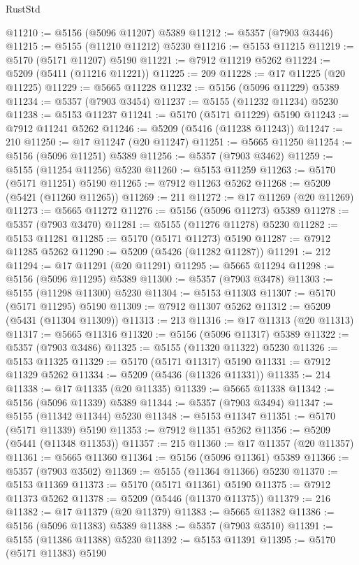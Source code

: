 \begin{lexlean}{RustStd}
\begin{coremodule}
@11210 := @5156 (@5096 @11207) @5389
@11212 := @5357 (@7903 @3446)
@11215 := @5155 (@11210 @11212) @5230
@11216 := @5153 @11215
@11219 := @5170 (@5171 @11207) @5190
@11221 := @7912 @11219 @5262
@11224 := @5209 (@5411 (@11216 @11221))
@11225 := 209
@11228 := @17 @11225 (@20 @11225)
@11229 := @5665 @11228
@11232 := @5156 (@5096 @11229) @5389
@11234 := @5357 (@7903 @3454)
@11237 := @5155 (@11232 @11234) @5230
@11238 := @5153 @11237
@11241 := @5170 (@5171 @11229) @5190
@11243 := @7912 @11241 @5262
@11246 := @5209 (@5416 (@11238 @11243))
@11247 := 210
@11250 := @17 @11247 (@20 @11247)
@11251 := @5665 @11250
@11254 := @5156 (@5096 @11251) @5389
@11256 := @5357 (@7903 @3462)
@11259 := @5155 (@11254 @11256) @5230
@11260 := @5153 @11259
@11263 := @5170 (@5171 @11251) @5190
@11265 := @7912 @11263 @5262
@11268 := @5209 (@5421 (@11260 @11265))
@11269 := 211
@11272 := @17 @11269 (@20 @11269)
@11273 := @5665 @11272
@11276 := @5156 (@5096 @11273) @5389
@11278 := @5357 (@7903 @3470)
@11281 := @5155 (@11276 @11278) @5230
@11282 := @5153 @11281
@11285 := @5170 (@5171 @11273) @5190
@11287 := @7912 @11285 @5262
@11290 := @5209 (@5426 (@11282 @11287))
@11291 := 212
@11294 := @17 @11291 (@20 @11291)
@11295 := @5665 @11294
@11298 := @5156 (@5096 @11295) @5389
@11300 := @5357 (@7903 @3478)
@11303 := @5155 (@11298 @11300) @5230
@11304 := @5153 @11303
@11307 := @5170 (@5171 @11295) @5190
@11309 := @7912 @11307 @5262
@11312 := @5209 (@5431 (@11304 @11309))
@11313 := 213
@11316 := @17 @11313 (@20 @11313)
@11317 := @5665 @11316
@11320 := @5156 (@5096 @11317) @5389
@11322 := @5357 (@7903 @3486)
@11325 := @5155 (@11320 @11322) @5230
@11326 := @5153 @11325
@11329 := @5170 (@5171 @11317) @5190
@11331 := @7912 @11329 @5262
@11334 := @5209 (@5436 (@11326 @11331))
@11335 := 214
@11338 := @17 @11335 (@20 @11335)
@11339 := @5665 @11338
@11342 := @5156 (@5096 @11339) @5389
@11344 := @5357 (@7903 @3494)
@11347 := @5155 (@11342 @11344) @5230
@11348 := @5153 @11347
@11351 := @5170 (@5171 @11339) @5190
@11353 := @7912 @11351 @5262
@11356 := @5209 (@5441 (@11348 @11353))
@11357 := 215
@11360 := @17 @11357 (@20 @11357)
@11361 := @5665 @11360
@11364 := @5156 (@5096 @11361) @5389
@11366 := @5357 (@7903 @3502)
@11369 := @5155 (@11364 @11366) @5230
@11370 := @5153 @11369
@11373 := @5170 (@5171 @11361) @5190
@11375 := @7912 @11373 @5262
@11378 := @5209 (@5446 (@11370 @11375))
@11379 := 216
@11382 := @17 @11379 (@20 @11379)
@11383 := @5665 @11382
@11386 := @5156 (@5096 @11383) @5389
@11388 := @5357 (@7903 @3510)
@11391 := @5155 (@11386 @11388) @5230
@11392 := @5153 @11391
@11395 := @5170 (@5171 @11383) @5190

\end{coremodule}
\end{lexlean}
